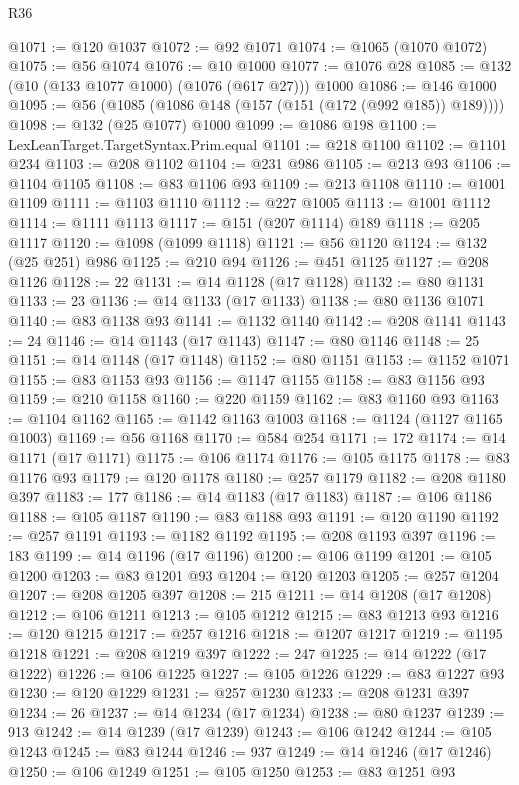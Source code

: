 \begin{lexlean}{R36}
\begin{coremodule}
@1071 := @120 @1037
@1072 := @92 @1071
@1074 := @1065 (@1070 @1072)
@1075 := @56 @1074
@1076 := @10 @1000
@1077 := @1076 @28
@1085 := @132 (@10 (@133 @1077 @1000) (@1076 (@617 @27))) @1000
@1086 := @146 @1000
@1095 := @56 (@1085 (@1086 @148 (@157 (@151 (@172 (@992 @185)) @189))))
@1098 := @132 (@25 @1077) @1000
@1099 := @1086 @198
@1100 := LexLeanTarget.TargetSyntax.Prim.equal
@1101 := @218 @1100
@1102 := @1101 @234
@1103 := @208 @1102
@1104 := @231 @986
@1105 := @213 @93
@1106 := @1104 @1105
@1108 := @83 @1106 @93
@1109 := @213 @1108
@1110 := @1001 @1109
@1111 := @1103 @1110
@1112 := @227 @1005
@1113 := @1001 @1112
@1114 := @1111 @1113
@1117 := @151 (@207 @1114) @189
@1118 := @205 @1117
@1120 := @1098 (@1099 @1118)
@1121 := @56 @1120
@1124 := @132 (@25 @251) @986
@1125 := @210 @94
@1126 := @451 @1125
@1127 := @208 @1126
@1128 := 22
@1131 := @14 @1128 (@17 @1128)
@1132 := @80 @1131
@1133 := 23
@1136 := @14 @1133 (@17 @1133)
@1138 := @80 @1136 @1071
@1140 := @83 @1138 @93
@1141 := @1132 @1140
@1142 := @208 @1141
@1143 := 24
@1146 := @14 @1143 (@17 @1143)
@1147 := @80 @1146
@1148 := 25
@1151 := @14 @1148 (@17 @1148)
@1152 := @80 @1151
@1153 := @1152 @1071
@1155 := @83 @1153 @93
@1156 := @1147 @1155
@1158 := @83 @1156 @93
@1159 := @210 @1158
@1160 := @220 @1159
@1162 := @83 @1160 @93
@1163 := @1104 @1162
@1165 := @1142 @1163 @1003
@1168 := @1124 (@1127 @1165 @1003)
@1169 := @56 @1168
@1170 := @584 @254
@1171 := 172
@1174 := @14 @1171 (@17 @1171)
@1175 := @106 @1174
@1176 := @105 @1175
@1178 := @83 @1176 @93
@1179 := @120 @1178
@1180 := @257 @1179
@1182 := @208 @1180 @397
@1183 := 177
@1186 := @14 @1183 (@17 @1183)
@1187 := @106 @1186
@1188 := @105 @1187
@1190 := @83 @1188 @93
@1191 := @120 @1190
@1192 := @257 @1191
@1193 := @1182 @1192
@1195 := @208 @1193 @397
@1196 := 183
@1199 := @14 @1196 (@17 @1196)
@1200 := @106 @1199
@1201 := @105 @1200
@1203 := @83 @1201 @93
@1204 := @120 @1203
@1205 := @257 @1204
@1207 := @208 @1205 @397
@1208 := 215
@1211 := @14 @1208 (@17 @1208)
@1212 := @106 @1211
@1213 := @105 @1212
@1215 := @83 @1213 @93
@1216 := @120 @1215
@1217 := @257 @1216
@1218 := @1207 @1217
@1219 := @1195 @1218
@1221 := @208 @1219 @397
@1222 := 247
@1225 := @14 @1222 (@17 @1222)
@1226 := @106 @1225
@1227 := @105 @1226
@1229 := @83 @1227 @93
@1230 := @120 @1229
@1231 := @257 @1230
@1233 := @208 @1231 @397
@1234 := 26
@1237 := @14 @1234 (@17 @1234)
@1238 := @80 @1237
@1239 := 913
@1242 := @14 @1239 (@17 @1239)
@1243 := @106 @1242
@1244 := @105 @1243
@1245 := @83 @1244
@1246 := 937
@1249 := @14 @1246 (@17 @1246)
@1250 := @106 @1249
@1251 := @105 @1250
@1253 := @83 @1251 @93

\end{coremodule}
\end{lexlean}
